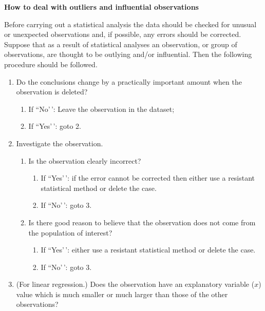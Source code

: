\documentclass[
  british,
  11pt,
  openany, a4paper]{book}
\providecommand{\tightlist}{%
  \setlength{\itemsep}{0pt}\setlength{\parskip}{0pt}}
\begin{document}
\textbf{How to deal with outliers and influential observations}

Before carrying out a statistical analysis the data should be checked for unusual or unexpected observations and, if possible, any errors should be corrected. Suppose that as a result of statistical analyses an observation, or group of observations, are thought to be outlying and/or influential. Then the following procedure should be followed.

\begin{enumerate}
\def\labelenumi{\arabic{enumi}.}
\item
  Do the conclusions change by a practically important amount when the observation is deleted?

  \begin{enumerate}
  \def\labelenumii{\alph{enumii}.}
  \tightlist
  \item
    If ``No'\,': Leave the observation in the dataset;
  \item
    If ``Yes'\,': goto 2.
  \end{enumerate}
\item
  Investigate the observation.

  \begin{enumerate}
  \def\labelenumii{\alph{enumii}.}
  \item
    Is the observation clearly incorrect?

    \begin{enumerate}
    \def\labelenumiii{\roman{enumiii}.}
    \tightlist
    \item
      If ``Yes'\,': if the error cannot be corrected then either use a resistant statistical method or delete the case.
    \item
      If ``No'\,': goto 3.
    \end{enumerate}
  \item
    Is there good reason to believe that the observation does not come from the population of interest?

    \begin{enumerate}
    \def\labelenumiii{\roman{enumiii}.}
    \tightlist
    \item
      If ``Yes'\,': either use a resistant statistical method or delete the case.
    \item
      If ``No'\,': goto 3.
    \end{enumerate}
  \end{enumerate}
\item
  (For linear regression.) Does the observation have an explanatory variable (\(x\)) value which is much smaller or much larger than those of the other observations?


\end{enumerate}
\end{document}
